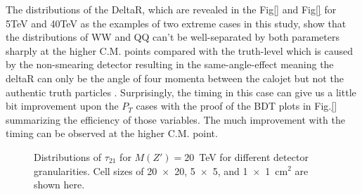 The distributions of the DeltaR, which are revealed in the Fig\ref{} and Fig\ref{} for 5TeV and 40TeV as the examples of two extreme cases in this study, show that the distributions of WW and QQ can't be well-separated by both parameters sharply at the higher C.M. points compared with the truth-level which is caused by the non-smearing detector resulting in the same-angle-effect meaning the deltaR can only be the angle of four momenta between the calojet but not the authentic truth particles . Surprisingly, the timing in this case can give us a little bit improvement upon the $P_{T}$ cases with the proof of the BDT plots in Fig.\ref{} summarizing the efficiency of those variables. The much improvement with the timing can be observed at the higher C.M. point.\\

\begin{figure}
\begin{center}
\end{center}
\caption{Distributions of $\tau_{21}$ for $M(Z') = 20$~TeV for different 
detector granularities. Cell sizes of 20~$\times$~20, 5~$\times$~5, and 1~$\times$~1~cm$^2$ 
are shown here. \label{fig:Rawhit_05GeV_tau21_Dis}}
\end{figure}

